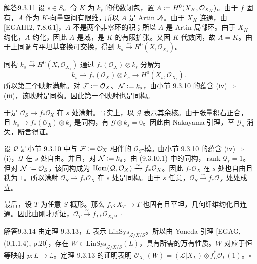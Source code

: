 \begin{origstatement}{解答}{9.3.11}\label{appA:ans9311}
设 $s\in S$。令 $K$ 为 $k_s$ 的代数闭包，置 $A\mathrel{\mathop:}= H^0(X_K,\mathcal O_{X_K})$。由于 $f$ 固有，$A$ 作为 $K$-向量空间有限维，所以 $A$ 是 Artin 环。由于 $X_K$ 连通，由 [EGAIII2, 7.8.6.1]，$A$ 不是两个非零环的积；所以 $A$ 是 Artin 局部环。由于 $X_K$ 约化，$A$ 约化，因此 $A$ 是域，是 $K$ 的有限扩张。又因 $K$ 代数闭，故 $A=K$。由于上同调与平坦基变换可交换，得到 $k_s\xrightarrow{\sim}H^0(X,\mathcal O_{X_s})$。

同构 $k_s\xrightarrow{\sim}H^0(X,\mathcal O_{X_s})$ 通过 $f_*(\mathcal O_X)\otimes k_s$ 分解为
\[
 k_s\longrightarrow f_*(\mathcal O_X)\otimes k_s\longrightarrow H^0(X_s,\mathcal O_{X_s}).
\]
所以第二个映射满射。对 $\mathcal F\mathrel{\mathop:}=\mathcal O_X$、$\mathcal N\mathrel{\mathop:}= k_s$，由小节 9.3.10 的蕴含 (iv)$\Rightarrow$(iii)，该映射是同构。因此第一个映射也是同构。

于是 $\mathcal O_S\to f_*\mathcal O_X$ 在 $s$ 处满射。事实上，以 $\mathcal G$ 表示其余核。由于张量积右正合，且 $k_s\to f_*(\mathcal O_X)\otimes k_s$ 是同构，有 $\mathcal G\otimes k_s=0$。因此由 Nakayama 引理，茎 $\mathcal G_s$ 消失，断言得证。

设 $\mathcal Q$ 是小节 9.3.10 中与 $\mathcal F\mathrel{\mathop:}=\mathcal O_X$ 相伴的 $\mathcal O_S$-模。由小节 9.3.10 的蕴含 (iv)$\Rightarrow$(i)，$\mathcal Q$ 在 $s$ 处自由。并且，对 $\mathcal N\mathrel{\mathop:}= k_s$，由 (9.3.10.1) 中的同构，$\operatorname{rank}\mathcal Q_s=1$。但对 $\mathcal N\mathrel{\mathop:}=\mathcal O_S$，该同构成为 $\operatorname{Hom}(\mathcal Q,\mathcal O_X)\xrightarrow{\sim}f_*\mathcal O_X$。因此 $f_*\mathcal O_X$ 在 $s$ 处也自由且秩为 $1$。所以满射 $\mathcal O_S\to f_*\mathcal O_X$ 在 $s$ 处是同构。由于 $s$ 任意，$\mathcal O_S\xrightarrow{\sim}f_*\mathcal O_X$ 处处成立。

最后，设 $T$ 为任意 $S$-概形。那么 $f_T\colon X_T\to T$ 也固有且平坦，几何纤维约化且连通。因此由刚才所证，$\mathcal O_T\xrightarrow{\sim}f_{T*}\mathcal O_{X_T}$。\hfill$\square$
\end{origstatement}

\begin{origstatement}{解答}{9.3.14}\label{appA:ans9314}
由定理 9.3.13，$L$ 表示 $\mathrm{LinSys}_{\mathcal L/X/S}$。所以由 Yoneda 引理 [EGAG, (0,1.1.4), p.20]，存在 $W\in\mathrm{LinSys}_{\mathcal L/X/S}(L)$，具有所需的万有性质。$W$ 对应于恒等映射 $p\colon L\to L$。定理 9.3.13 的证明表明 $\mathcal O_{X_L}(W)=(\mathcal L|X_L)\otimes f_L^*\mathcal O_L(1)$。\hfill$\square$
\end{origstatement}


